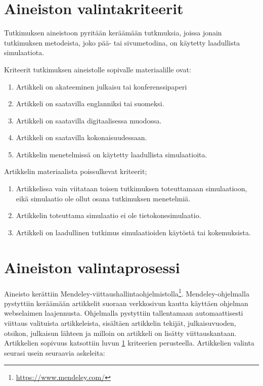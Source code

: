 \documentclass[utf8]{gradu3}
\begin{document}
\section{Aineiston valintakriteerit} \label{valintakriteerit}
Tutkimuksen aineistoon pyritään keräämään tutkmuksia, joissa jonain tutkimuksen metodeista, joko pää- tai sivumetodina, on käytetty laadullista simulaatiota.

Kriteerit tutkimuksen aineistolle sopivalle materiaalille ovat:
\begin{enumerate}
    \item Artikkeli on akateeminen julkaisu tai konferenssipaperi
    \item Artikkeli on saatavilla englanniksi tai suomeksi.
    \item Artikkeli on saatavilla digitaalisessa muodossa.
    \item Artikkeli on saatavilla kokonaisuudessaan.
    \item Artikkelin menetelmissä on käytetty laadullista simulaatioita.
\end{enumerate}

Artikkelin materiaalista poissulkevat kriteerit;
\begin{enumerate}
    \item Artikkelissa vain viitataan toisen tutkimuksen toteuttamaan simulaatioon, eikä simulaatio ole ollut osana tutkimuksen menetelmiä.
    \item Artikkelin toteuttama simulaatio ei ole tietokonesimulaatio.
    \item Artikkeli on laadullinen tutkimus simulaatioiden käytöstä tai kokemuksista.
\end{enumerate}

\section{Aineiston valintaprosessi} \label{valintaprosessi}
Aineisto kerättiin Mendeley-viittaushallintaohjelmistolla\footnote{\url{https://www.mendeley.com/}}. Mendeley-ohjelmalla pystyttiin keräämään artikkelit suoraan verkkosivun kautta käyttäen ohjelman webselaimen laajennusta. Ohjelmalla pystyttiin tallentamaan automaattisesti viittaus valituista artikkeleista, sisältäen artikkelin tekijät, julkaisuvuoden, otsikon, julkaisun lähteen ja milloin on artikkeli on lisätty viittauskantaan. Artikkelien sopivuus katsottiin luvun \ref{valintakriteerit} kriteerien perusteella. Artikkelien valinta seurasi usein seuraavia askeleita:
\end{document}
